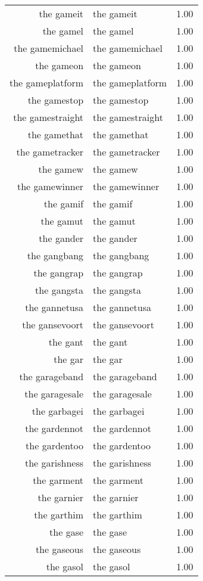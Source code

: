\begin{table}[ht]
\begin{tabular}{rlr}
  the gameit & the gameit & 1.00 \\ 
  the gamel & the gamel & 1.00 \\ 
  the gamemichael & the gamemichael & 1.00 \\ 
  the gameon & the gameon & 1.00 \\ 
  the gameplatform & the gameplatform & 1.00 \\ 
  the gamestop & the gamestop & 1.00 \\ 
  the gamestraight & the gamestraight & 1.00 \\ 
  the gamethat & the gamethat & 1.00 \\ 
  the gametracker & the gametracker & 1.00 \\ 
  the gamew & the gamew & 1.00 \\ 
  the gamewinner & the gamewinner & 1.00 \\ 
  the gamif & the gamif & 1.00 \\ 
  the gamut & the gamut & 1.00 \\ 
  the gander & the gander & 1.00 \\ 
  the gangbang & the gangbang & 1.00 \\ 
  the gangrap & the gangrap & 1.00 \\ 
  the gangsta & the gangsta & 1.00 \\ 
  the gannetusa & the gannetusa & 1.00 \\ 
  the gansevoort & the gansevoort & 1.00 \\ 
  the gant & the gant & 1.00 \\ 
  the gar & the gar & 1.00 \\ 
  the garageband & the garageband & 1.00 \\ 
  the garagesale & the garagesale & 1.00 \\ 
  the garbagei & the garbagei & 1.00 \\ 
  the gardennot & the gardennot & 1.00 \\ 
  the gardentoo & the gardentoo & 1.00 \\ 
  the garishness & the garishness & 1.00 \\ 
  the garment & the garment & 1.00 \\ 
  the garnier & the garnier & 1.00 \\ 
  the garthim & the garthim & 1.00 \\ 
  the gase & the gase & 1.00 \\ 
  the gaseous & the gaseous & 1.00 \\ 
  the gasol & the gasol & 1.00 \\ 

\end{tabular}
\end{table}
